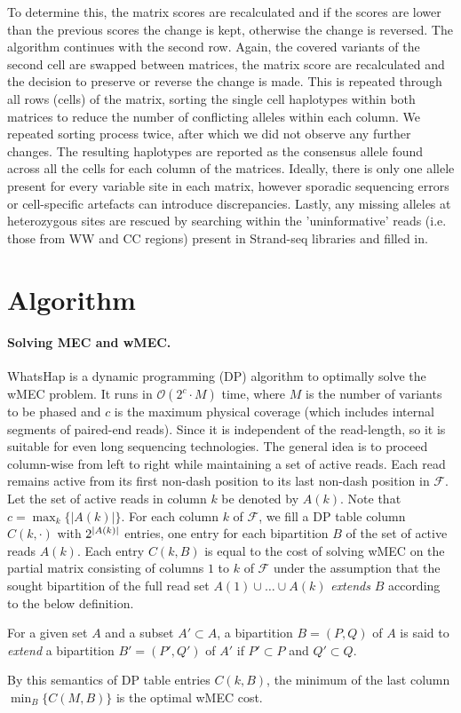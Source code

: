 	To determine this, the matrix scores are recalculated and if the scores are lower than the previous scores the change is kept, otherwise the change is reversed. 
	The algorithm continues with the second row. Again, the covered variants of the second cell are swapped between matrices, the matrix score are recalculated and the decision to preserve or reverse the change is made. 
	This is repeated through all rows (cells) of the matrix, sorting the single cell haplotypes within both matrices to reduce the number of conflicting alleles within each column. 
	We repeated sorting process twice, after which we did not observe any further changes. 
	The resulting haplotypes are reported as the consensus allele found across all the cells for each column of the matrices. 
	Ideally, there is only one allele present for every variable site in each matrix, however sporadic sequencing errors or cell-specific artefacts can introduce discrepancies. 
	Lastly, any missing alleles at heterozygous sites are rescued by searching within the 'uninformative' reads (i.e. those from WW and CC regions) present in Strand-seq libraries and filled in. 
	
\section{Algorithm}\label{sec:algorithm}
\paragraph{Solving MEC and wMEC.}
WhatsHap \citep{Patterson2015} is a dynamic programming (DP) algorithm to optimally solve the wMEC problem.
It runs in $\mathcal{O}(2^c\cdot M)$ time, where $M$ is the number of variants to be phased and $c$ is the maximum physical coverage (which includes internal segments of paired-end reads).
Since it is independent of the read-length, so it is suitable for even long sequencing technologies.
The general idea is to proceed column-wise from left to right while maintaining a set of active reads.
Each read remains active from its first non-dash position to its last non-dash position in $\mathcal{F}$.
Let the set of active reads in column $k$ be denoted by $A(k)$.
Note that $c=\max_{k}\{|A(k)|\}$.
For each column $k$ of $\mathcal{F}$, we fill a DP table column $C(k,\cdot)$ with $2^{\left\lvert A(k) \right\rvert}$ entries, one entry for each bipartition $B$ of the set of active reads $A(k)$.
Each entry $C(k,B)$ is equal to the cost of solving wMEC on the partial matrix consisting of columns $1$ to $k$ of $\mathcal{F}$ under the assumption that the sought bipartition of the full read set $A(1)\cup\ldots\cup A(k)$ \emph{extends} $B$ according to the below definition.
\begin{definition}
For a given set $A$ and a subset $A'\subset A$, a bipartition $B=(P,Q)$ of $A$ is said to \emph{extend} a bipartition $B'=(P',Q')$ of $A'$ if $P'\subset P$ and $Q'\subset Q$.
\end{definition}
By this semantics of DP table entries $C(k,B)$, the minimum of the last column $\min_B\{C(M,B)\}$ is the optimal wMEC cost.

